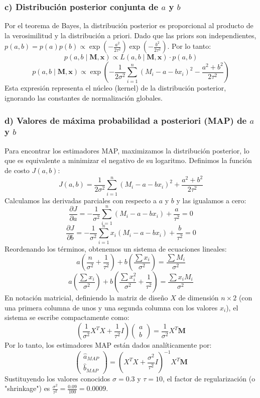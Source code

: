 \documentclass[12pt]{article}
\begin{document}
\subsubsection*{c) Distribución posterior conjunta de $a$ y $b$}
Por el teorema de Bayes, la distribución posterior es proporcional al producto de la verosimilitud y la distribución a priori. Dado que las priors son independientes, $p(a, b) = p(a)p(b) \propto \exp\left( -\frac{a^2}{2\tau^2} \right) \exp\left( -\frac{b^2}{2\tau^2} \right)$. Por lo tanto:
$$
p(a, b \mid \mathbf{M}, \mathbf{x}) \propto L(a, b \mid \mathbf{M}, \mathbf{x}) \cdot p(a, b)
$$
$$
p(a, b \mid \mathbf{M}, \mathbf{x}) \propto \exp\left( -\frac{1}{2\sigma^2} \sum_{i=1}^n (M_i - a - b x_i)^2 - \frac{a^2 + b^2}{2\tau^2} \right)
$$
Esta expresión representa el núcleo (kernel) de la distribución posterior, ignorando las constantes de normalización globales.

\subsubsection*{d) Valores de máxima probabilidad a posteriori (MAP) de $a$ y $b$}
Para encontrar los estimadores MAP, maximizamos la distribución posterior, lo que es equivalente a minimizar el negativo de su logaritmo. Definimos la función de costo $J(a, b)$:
$$
J(a, b) = \frac{1}{2\sigma^2} \sum_{i=1}^n (M_i - a - b x_i)^2 + \frac{a^2 + b^2}{2\tau^2}
$$
Calculamos las derivadas parciales con respecto a $a$ y $b$ y las igualamos a cero:
$$
\frac{\partial J}{\partial a} = -\frac{1}{\sigma^2} \sum_{i=1}^n (M_i - a - b x_i) + \frac{a}{\tau^2} = 0
$$
$$
\frac{\partial J}{\partial b} = -\frac{1}{\sigma^2} \sum_{i=1}^n x_i (M_i - a - b x_i) + \frac{b}{\tau^2} = 0
$$
Reordenando los términos, obtenemos un sistema de ecuaciones lineales:
$$
a \left( \frac{n}{\sigma^2} + \frac{1}{\tau^2} \right) + b \left( \frac{\sum x_i}{\sigma^2} \right) = \frac{\sum M_i}{\sigma^2}
$$
$$
a \left( \frac{\sum x_i}{\sigma^2} \right) + b \left( \frac{\sum x_i^2}{\sigma^2} + \frac{1}{\tau^2} \right) = \frac{\sum x_i M_i}{\sigma^2}
$$
En notación matricial, definiendo la matriz de diseño $X$ de dimensión $n \times 2$ (con una primera columna de unos y una segunda columna con los valores $x_i$), el sistema se escribe compactamente como:
$$
\left( \frac{1}{\sigma^2} X^T X + \frac{1}{\tau^2} I \right) \begin{pmatrix} a \\ b \end{pmatrix} = \frac{1}{\sigma^2} X^T \mathbf{M}
$$
Por lo tanto, los estimadores MAP están dados analíticamente por:
$$
\begin{pmatrix} \hat{a}_{MAP} \\ \hat{b}_{MAP} \end{pmatrix} = \left( X^T X + \frac{\sigma^2}{\tau^2} I \right)^{-1} X^T \mathbf{M}
$$
Sustituyendo los valores conocidos $\sigma = 0.3$ y $\tau = 10$, el factor de regularización (o "shrinkage") es $\frac{\sigma^2}{\tau^2} = \frac{0.09}{100} = 0.0009$.
\end{document}
